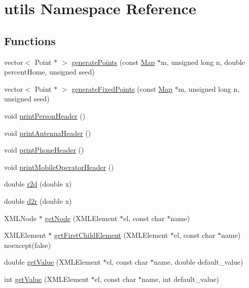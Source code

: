 \hypertarget{namespaceutils}{}\section{utils Namespace Reference}
\label{namespaceutils}
\subsection*{Functions}
\begin{DoxyCompactItemize}
\item 
vector$<$ Point $\ast$ $>$ \mbox{\hyperlink{namespaceutils_a16e957d5c26b39c840f6e109dd19d45d}{generate\+Points}} (const \mbox{\hyperlink{class_map}{Map}} $\ast$m, unsigned long n, double percent\+Home, unsigned seed)
\item 
vector$<$ Point $\ast$ $>$ \mbox{\hyperlink{namespaceutils_acd746b43155fa3033001f28a91a71cec}{generate\+Fixed\+Points}} (const \mbox{\hyperlink{class_map}{Map}} $\ast$m, unsigned long n, unsigned seed)
\item 
void \mbox{\hyperlink{namespaceutils_a1978a6ccb2360773215aba027d8b6f08}{print\+Person\+Header}} ()
\item 
void \mbox{\hyperlink{namespaceutils_a2080e7db5afc5bb1b4c9ef5336f78ccb}{print\+Antenna\+Header}} ()
\item 
void \mbox{\hyperlink{namespaceutils_a7633a4dfe509a009f4e02850b03ba1e4}{print\+Phone\+Header}} ()
\item 
void \mbox{\hyperlink{namespaceutils_a207e9d12cc075f601c7fa32ac010b346}{print\+Mobile\+Operator\+Header}} ()
\item 
double \mbox{\hyperlink{namespaceutils_af70f6f3c2ac66aa3b4ce64a3b48288cb}{r2d}} (double x)
\item 
double \mbox{\hyperlink{namespaceutils_a1d747e438d856e6c46cd1fe558fe3821}{d2r}} (double x)
\item 
X\+M\+L\+Node $\ast$ \mbox{\hyperlink{namespaceutils_a707d0fc1b0346b7da16a6f7714a7f24d}{get\+Node}} (X\+M\+L\+Element $\ast$el, const char $\ast$name)
\item 
X\+M\+L\+Element $\ast$ \mbox{\hyperlink{namespaceutils_a929f9a6daaf5e504356ea4af5918c34b}{get\+First\+Child\+Element}} (X\+M\+L\+Element $\ast$el, const char $\ast$name) noexcept(false)
\item 
double \mbox{\hyperlink{namespaceutils_a90cdccb9260004c67a61003d648b4e14}{get\+Value}} (X\+M\+L\+Element $\ast$el, const char $\ast$name, double default\+\_\+value)
\item 
int \mbox{\hyperlink{namespaceutils_a50983d6cf6c443990ee6d15d8082f2c7}{get\+Value}} (X\+M\+L\+Element $\ast$el, const char $\ast$name, int default\+\_\+value)

\end{DoxyCompactItemize}
